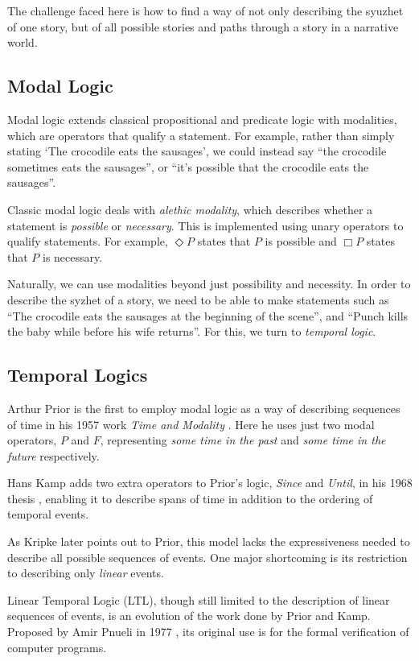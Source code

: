 \documentclass{llncs}
\begin{document}
The challenge faced here is how to find a way of not only describing the syuzhet of one story, but of all possible stories and paths through a story in a narrative world.

\subsection{Modal Logic}
Modal logic extends classical propositional and predicate logic with modalities, which are operators that qualify a statement. For example, rather than simply stating `The crocodile eats the sausages', we could instead say ``the crocodile sometimes eats the sausages'', or ``it's possible that the crocodile eats the sausages''.

Classic modal logic deals with \emph{alethic modality}, which describes whether a statement is \emph{possible} or \emph{necessary}. This is implemented using unary operators to qualify statements. For example, $\Diamond P$ states that $P$ is possible and $\Box P$ states that $P$ is necessary.

Naturally, we can use modalities beyond just possibility and necessity. In order to describe the syzhet of a story, we need to be able to make statements such as ``The crocodile eats the sausages at the beginning of the scene'', and ``Punch kills the baby while before his wife returns''. For this, we turn to \emph{temporal logic}.

\subsection{Temporal Logics}
Arthur Prior is the first to employ modal logic as a way of describing sequences of time in his 1957 work \emph{Time and Modality} \cite{prior2003time}. Here he uses just two modal operators, $P$ and $F$, representing \emph{some time in the past} and \emph{some time in the future} respectively.

Hans Kamp adds two extra operators to Prior's logic, \emph{Since} and \emph{Until}, in his 1968 thesis \cite{kamp1968tense}, enabling it to describe spans of time in addition to the ordering of temporal events.

As Kripke later points out to Prior, this model lacks the expressiveness needed to describe all possible sequences of events. One major shortcoming is its restriction to describing only \emph{linear} events. 

Linear Temporal Logic (LTL), though still limited to the description of linear sequences of events, is an evolution of the work done by Prior and Kamp. Proposed by Amir Pnueli in 1977 \cite{pnueli1977temporal}, its original use is for the formal verification of computer programs.
\end{document}

